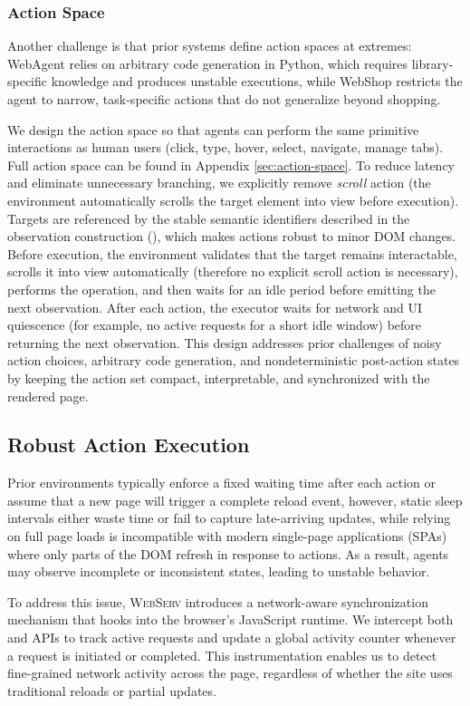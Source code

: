 \documentclass{article}
\DeclareRobustCommand{\projectname}{\textsc{WebServ}\xspace}
\begin{document}
\subsubsection{Action Space}
Another challenge is that prior systems define action spaces at extremes: WebAgent relies on arbitrary code generation in Python, which requires library-specific knowledge and produces unstable executions, while WebShop restricts the agent to narrow, task-specific actions that do not generalize beyond shopping.  

We design the action space so that agents can perform the same primitive interactions as human users (click, type, hover, select, navigate, manage tabs). Full action space can be found in Appendix \ref{sec:action-space}. To reduce latency and eliminate unnecessary branching, we explicitly remove \emph{scroll} action (the environment automatically scrolls the target element into view before execution). Targets are referenced by the stable semantic identifiers described in the observation construction (), which makes actions robust to minor DOM changes. 
Before execution, the environment validates that the target remains interactable, scrolls it into view automatically (therefore no explicit scroll action is necessary), performs the operation, and then waits for an idle period before emitting the next observation. 
After each action, the executor waits for network and UI quiescence (for example, no active requests for a short idle window) before returning the next observation. This design addresses prior challenges of noisy action choices, arbitrary code generation, and nondeterministic post-action states by keeping the action set compact, interpretable, and synchronized with the rendered page.


\subsection{Robust Action Execution}

Prior environments typically enforce a fixed waiting time after each action or assume that a new page will trigger a complete reload event, however, static sleep intervals either waste time or fail to capture late-arriving updates, while relying on full page loads is incompatible with modern single-page applications (SPAs) where only parts of the DOM refresh in response to actions. As a result, agents may observe incomplete or inconsistent states, leading to unstable behavior.

To address this issue, \projectname introduces a network-aware synchronization mechanism that hooks into the browser's JavaScript runtime. We intercept both  and  APIs to track active requests and update a global activity counter whenever a request is initiated or completed. This instrumentation enables us to detect fine-grained network activity across the page, regardless of whether the site uses traditional reloads or partial updates.
\end{document}
